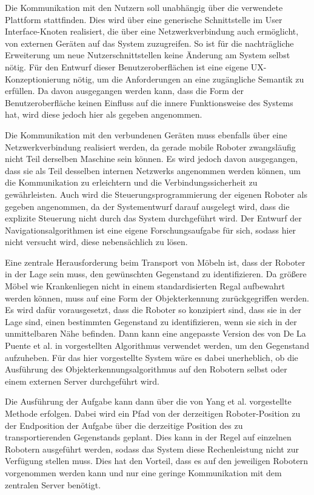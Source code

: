 Die Kommunikation mit den Nutzern soll unabhängig über die verwendete Plattform stattfinden. Dies wird über eine generische Schnittstelle im User Interface-Knoten realisiert, die über eine Netzwerkverbindung auch ermöglicht, von externen Geräten auf das System zuzugreifen. So ist für die nachträgliche Erweiterung um neue Nutzerschnittstellen keine Änderung am System selbst nötig. Für den Entwurf dieser Benutzeroberflächen ist eine eigene UX-Konzeptionierung nötig, um die Anforderungen an eine zugängliche Semantik zu erfüllen. Da davon ausgegangen werden kann, dass die Form der Benutzeroberfläche keinen Einfluss auf die innere Funktionsweise des Systems hat, wird diese jedoch hier als gegeben angenommen.

Die Kommunikation mit den verbundenen Geräten muss ebenfalls über eine Netzwerkverbindung realisiert werden, da gerade mobile Roboter zwangsläufig nicht Teil derselben Maschine sein können. Es wird jedoch davon ausgegangen, dass sie als Teil desselben internen Netzwerks angenommen werden können, um die Kommunikation zu erleichtern und die Verbindungssicherheit zu gewährleisten. Auch wird die Steuerungsprogrammierung der eigenen Roboter als gegeben angenommen, da der Systementwurf darauf ausgelegt wird, dass die explizite Steuerung nicht durch das System durchgeführt wird. Der Entwurf der Navigationsalgorithmen ist eine eigene Forschungsaufgabe für sich, sodass hier nicht versucht wird, diese nebensächlich zu lösen.

Eine zentrale Herausforderung beim Transport von Möbeln ist, dass der Roboter in der Lage sein muss, den gewünschten Gegenstand zu identifizieren. Da größere Möbel wie Krankenliegen nicht in einem standardisierten Regal aufbewahrt werden können, muss auf eine Form der Objekterkennung zurückgegriffen werden. Es wird dafür vorausgesetzt, dass die Roboter so konzipiert sind, dass sie in der Lage sind, einen bestimmten Gegenstand zu identifizieren, wenn sie sich in der unmittelbaren Nähe befinden. Dann kann eine angepasste Version des von De La Puente et al. in \cite{assistRobot} vorgestellten Algorithmus verwendet werden, um den Gegenstand aufzuheben. Für das hier vorgestellte System wäre es dabei unerheblich, ob die Ausführung des Objekterkennungsalgorithmus auf den Robotern selbst oder einem externen Server durchgeführt wird.

Die Ausführung der Aufgabe kann dann über die von Yang et al. \cite{2DPlan} vorgestellte Methode erfolgen. Dabei wird ein Pfad von der derzeitigen Roboter-Position zu der Endposition der Aufgabe über die derzeitige Position des zu transportierenden Gegenstands geplant. Dies kann in der Regel auf einzelnen Robotern ausgeführt werden, sodass das System diese Rechenleistung nicht zur Verfügung stellen muss. Dies hat den Vorteil, dass es auf den jeweiligen Robotern vorgenommen werden kann und nur eine geringe Kommunikation mit dem zentralen Server benötigt.


